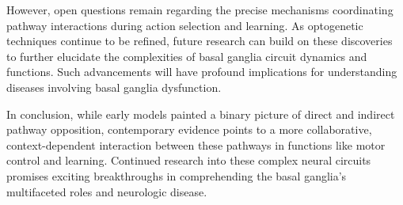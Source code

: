 \documentclass[10pt]{article}
\begin{document}
\begin{sloppypar}
  However, open questions remain regarding the precise mechanisms coordinating pathway interactions during action selection and learning. As optogenetic techniques continue to be refined, future research can build on these discoveries to further elucidate the complexities of basal ganglia circuit dynamics and functions. Such advancements will have profound implications for understanding diseases involving basal ganglia dysfunction.

  In conclusion, while early models painted a binary picture of direct and indirect pathway opposition, contemporary evidence points to a more collaborative, context-dependent interaction between these pathways in functions like motor control and learning. Continued research into these complex neural circuits promises exciting breakthroughs in comprehending the basal ganglia’s multifaceted roles and neurologic disease.

  \pagebreak
  \singlespacing %
  
  

\end{sloppypar}
\end{document}
